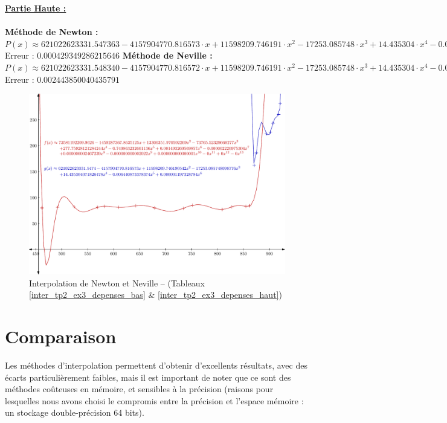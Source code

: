 \documentclass{report}
\begin{document}
	\noindent\underline{\textbf{Partie Haute :}} \\ \\
	\textbf{Méthode de Newton :}\\
	$P(x) \approx 621022623331.547363-4157904770.816573 \cdot x + 11598209.746191 \cdot x^{2} - 17253.085748 \cdot x^{3}  + 14.435304 \cdot x^{4} - 0.006441 \cdot x^{5}  + 0.000001 \cdot x^{6} $\\
	Erreur : $0.000429349286215646$
	\newline
	\newline
	\textbf{Méthode de Neville :}\\
	$P(x) \approx 621022623331.548340-4157904770.816572 \cdot x + 11598209.746191 \cdot x^{2} - 17253.085748 \cdot x^{3}  + 14.435304 \cdot x^{4} - 0.006441 \cdot x^{5}  + 0.000001 \cdot x^{6} $\\
	Erreur : $0.002443850040435791$
      \newpage
      \begin{figure}[h]
	\centering
	\includegraphics[scale=0.85]{graphiques/pdf_output/inter_tp2_ex3.pdf}
	\caption{Interpolation de Newton et Neville -- (Tableaux \ref{inter_tp2_ex3_depenses_bas} \& \ref{inter_tp2_ex3_depenses_haut})}
      \end{figure}
    \newpage
    \section{Comparaison}
      Les méthodes d'interpolation permettent d'obtenir d'excellents résultats, avec des écarts particulièrement faibles, mais il est important de noter que ce sont des méthodes coûteuses en mémoire, et sensibles à la précision (raisons pour lesquelles nous avons choisi le compromis entre la précision et l'espace mémoire : un stockage double-précision 64 bits).\\ \\
      
\end{document}
